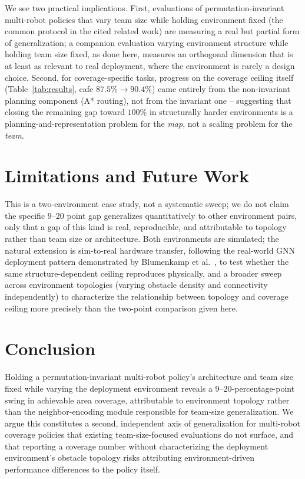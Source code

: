 \documentclass[12pt]{article}
\begin{document}
We see two practical implications. First, evaluations of permutation-invariant
multi-robot policies that vary team size while holding environment fixed (the
common protocol in the cited related work) are measuring a real but partial
form of generalization; a companion evaluation varying environment structure
while holding team size fixed, as done here, measures an orthogonal
dimension that is at least as relevant to real deployment, where the
environment is rarely a design choice. Second, for coverage-specific tasks,
progress on the coverage ceiling itself (Table~\ref{tab:results}, cafe
$87.5\%\to90.4\%$) came entirely from the non-invariant planning component
(A* routing), not from the invariant one -- suggesting that closing the
remaining gap toward $100\%$ in structurally harder environments is a
planning-and-representation problem for the \emph{map}, not a scaling
problem for the \emph{team}.

\section{Limitations and Future Work}
This is a two-environment case study, not a systematic sweep; we do not
claim the specific $9$--$20$ point gap generalizes quantitatively to other
environment pairs, only that a gap of this kind is real, reproducible, and
attributable to topology rather than team size or architecture. Both
environments are simulated; the natural extension is sim-to-real hardware
transfer, following the real-world GNN deployment pattern demonstrated by
Blumenkamp et al.~\cite{gnnrealworld2021}, to test whether the same
structure-dependent ceiling reproduces physically, and a broader sweep across
environment topologies (varying obstacle density and connectivity
independently) to characterize the relationship between topology and
coverage ceiling more precisely than the two-point comparison given here.

\section{Conclusion}
Holding a permutation-invariant multi-robot policy's architecture and team
size fixed while varying the deployment environment reveals a
$9$--$20$-percentage-point swing in achievable area coverage, attributable to
environment topology rather than the neighbor-encoding module responsible
for team-size generalization. We argue this constitutes a second,
independent axis of generalization for multi-robot coverage policies that
existing team-size-focused evaluations do not surface, and that reporting a
coverage number without characterizing the deployment environment's obstacle
topology risks attributing environment-driven performance differences to the
policy itself.



\end{document}
